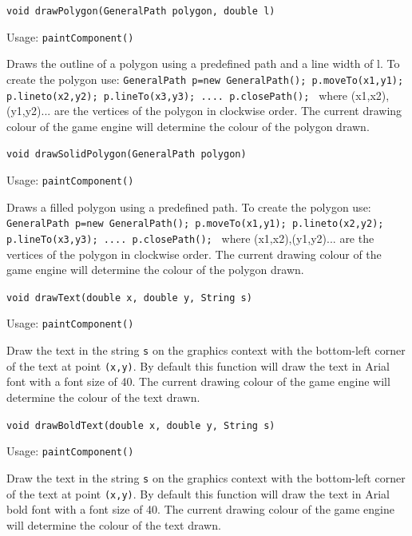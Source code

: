 \documentclass[a4paper, 10pt]{report}
\begin{document}
\hrulefill

{\large {\tt void drawPolygon(GeneralPath polygon, double l)}}

Usage: {\tt paintComponent()}

Draws the outline of a polygon using a predefined path and a line width of l. To create the polygon use: {\tt GeneralPath p=new GeneralPath();
p.moveTo(x1,y1);
p.lineto(x2,y2);
p.lineTo(x3,y3);
....
p.closePath();
} where (x1,x2),(y1,y2)... are the vertices of the polygon in clockwise order. The current drawing colour of the game engine will determine the colour of the polygon drawn.

\hrulefill

{\large {\tt void drawSolidPolygon(GeneralPath polygon)}}

Usage: {\tt paintComponent()}

Draws a filled polygon using a predefined path. To create the polygon use: {\tt GeneralPath p=new GeneralPath();
p.moveTo(x1,y1);
p.lineto(x2,y2);
p.lineTo(x3,y3);
....
p.closePath();
} where (x1,x2),(y1,y2)... are the vertices of the polygon in clockwise order. The current drawing colour of the game engine will determine the colour of the polygon drawn.


\hrulefill

{\large {\tt void drawText(double x, double y, String s)}}

Usage: {\tt paintComponent()}

Draw the text in the string {\tt s} on the graphics context with the bottom-left corner of the text at point {\tt (x,y)}. By default this function will draw the text in Arial font with a font size of 40. The current drawing colour of the game engine will determine the colour of the text drawn.

\hrulefill

{\large {\tt void drawBoldText(double x, double y, String s)}}

Usage: {\tt paintComponent()}

Draw the text in the string {\tt s} on the graphics context with the bottom-left corner of the text at point {\tt (x,y)}. By default this function will draw the text in Arial bold font with a font size of 40. The current drawing colour of the game engine will determine the colour of the text drawn.


\hrulefill
\end{document}
